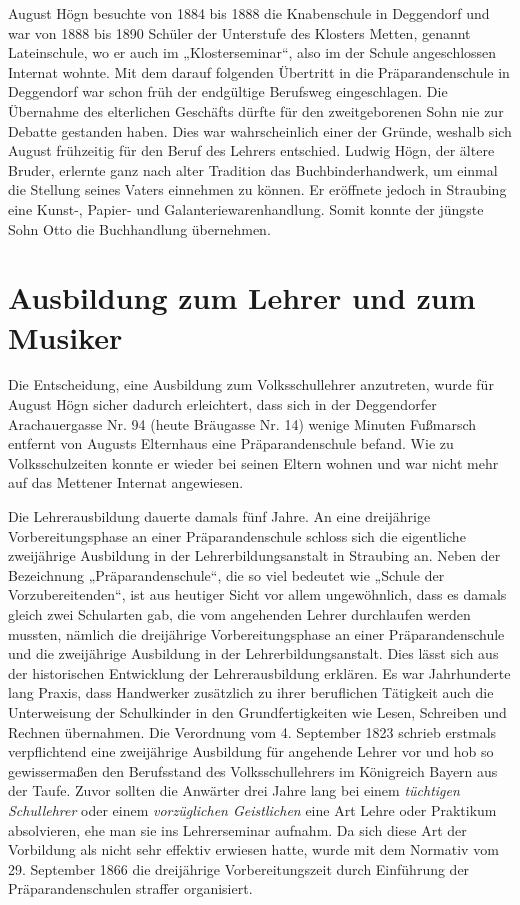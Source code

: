\documentclass{book}
\newcommand{\zitat}[1]{\textit{#1}}
\begin{document}
August Högn besuchte von 1884 bis 1888 die Knabenschule in Deggendorf
und war von 1888 bis 1890 Schüler der Unterstufe des Klosters Metten,
genannt Lateinschule, wo er auch im „Klosterseminar“, also im der
Schule angeschlossen Internat wohnte. Mit dem darauf folgenden
Übertritt in die Präparandenschule in Deggendorf war schon früh der
endgültige Berufsweg eingeschlagen. Die Übernahme des elterlichen
Geschäfts dürfte für den zweitgeborenen Sohn nie zur Debatte gestanden
haben. Dies war wahrscheinlich einer der Gründe, weshalb sich August
frühzeitig für den Beruf des Lehrers entschied. Ludwig Högn, der ältere
Bruder, erlernte ganz nach alter Tradition das Buchbinderhandwerk, um
einmal die Stellung seines Vaters einnehmen zu können. Er eröffnete
jedoch in Straubing eine Kunst-, Papier- und Galanteriewarenhandlung.
Somit konnte der jüngste Sohn Otto die Buchhandlung übernehmen.

\section{Ausbildung zum Lehrer und zum Musiker}

Die Entscheidung, eine Ausbildung zum Volksschullehrer anzutreten, wurde
für August Högn sicher dadurch erleichtert, dass sich in der
Deggendorfer Arachauergasse Nr. 94 (heute Bräugasse Nr. 14) wenige
Minuten Fußmarsch entfernt von Augusts Elternhaus eine
Präparandenschule befand. Wie zu Volksschulzeiten konnte er wieder bei
seinen Eltern wohnen und war nicht mehr auf das Mettener Internat
angewiesen.

Die Lehrerausbildung dauerte damals fünf Jahre. An eine dreijährige
Vorbereitungsphase an einer Präparandenschule schloss sich die
eigentliche zweijährige Ausbildung in der Lehrerbildungsanstalt in
Straubing an. Neben der Bezeichnung „Präparandenschule“, die so viel
bedeutet wie „Schule der Vorzubereitenden“, ist aus heutiger Sicht
vor allem ungewöhnlich, dass es damals gleich zwei Schularten gab, die
vom angehenden Lehrer durchlaufen werden mussten, nämlich die
dreijährige Vorbereitungsphase an einer Präparandenschule und die
zweijährige Ausbildung in der Lehrerbildungsanstalt. Dies lässt sich
aus der historischen Entwicklung der Lehrerausbildung erklären. Es war
Jahrhunderte lang Praxis, dass Handwerker zusätzlich zu ihrer
beruflichen Tätigkeit auch die Unterweisung der Schulkinder in den
Grundfertigkeiten wie Lesen, Schreiben und Rechnen übernahmen. Die
Verordnung vom 4. September 1823 schrieb erstmals verpflichtend eine
zweijährige Ausbildung für angehende Lehrer vor und hob so
gewissermaßen den Berufsstand des Volksschullehrers im Königreich
Bayern aus der Taufe. Zuvor sollten die Anwärter drei Jahre lang bei
einem \zitat{tüchtigen Schullehrer} oder einem
\zitat{vorzüglichen Geistlichen} eine Art Lehre oder
Praktikum absolvieren, ehe man sie ins Lehrerseminar aufnahm. Da sich
diese Art der Vorbildung als nicht sehr effektiv erwiesen hatte, wurde
mit dem Normativ vom 29. September 1866 die dreijährige
Vorbereitungszeit durch Einführung der Präparandenschulen straffer
organisiert.
\end{document}
